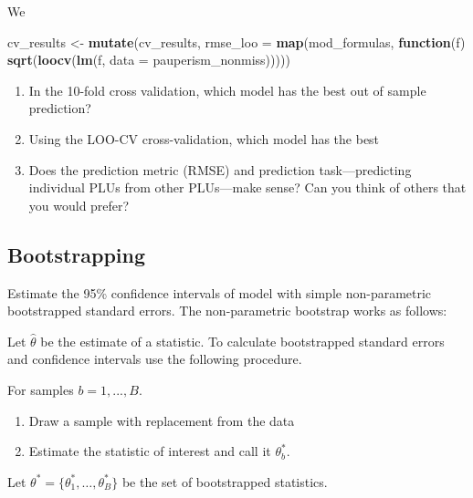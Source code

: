 \documentclass[]{article}
\newenvironment{Shaded}{\begin{snugshade}}{\end{snugshade}}
\newcommand{\KeywordTok}[1]{\textcolor[rgb]{0.13,0.29,0.53}{\textbf{#1}}}
\newcommand{\DataTypeTok}[1]{\textcolor[rgb]{0.13,0.29,0.53}{#1}}
\newcommand{\StringTok}[1]{\textcolor[rgb]{0.31,0.60,0.02}{#1}}
\newcommand{\ControlFlowTok}[1]{\textcolor[rgb]{0.13,0.29,0.53}{\textbf{#1}}}
\newcommand{\NormalTok}[1]{#1}
\providecommand{\tightlist}{%
  \setlength{\itemsep}{0pt}\setlength{\parskip}{0pt}}
\begin{document}
We

\begin{Shaded}
\begin{Highlighting}[]
\NormalTok{cv_results <-}\StringTok{ }
\StringTok{  }\KeywordTok{mutate}\NormalTok{(cv_results, }
         \DataTypeTok{rmse_loo =} \KeywordTok{map}\NormalTok{(mod_formulas, }\ControlFlowTok{function}\NormalTok{(f) }\KeywordTok{sqrt}\NormalTok{(}\KeywordTok{loocv}\NormalTok{(}\KeywordTok{lm}\NormalTok{(f, }\DataTypeTok{data =}\NormalTok{ pauperism_nonmiss)))))}
\end{Highlighting}
\end{Shaded}

\begin{enumerate}
\def\labelenumi{\arabic{enumi}.}
\tightlist
\item
  In the 10-fold cross validation, which model has the best out of
  sample prediction?
\item
  Using the LOO-CV cross-validation, which model has the best
\item
  Does the prediction metric (RMSE) and prediction task---predicting
  individual PLUs from other PLUs---make sense? Can you think of others
  that you would prefer?
\end{enumerate}

\subsection{Bootstrapping}\label{bootstrapping}

Estimate the 95\% confidence intervals of model with simple
non-parametric bootstrapped standard errors. The non-parametric
bootstrap works as follows:

Let \(\hat\theta\) be the estimate of a statistic. To calculate
bootstrapped standard errors and confidence intervals use the following
procedure.

For samples \(b = 1, ..., B\).

\begin{enumerate}
\def\labelenumi{\arabic{enumi}.}
\tightlist
\item
  Draw a sample with replacement from the data
\item
  Estimate the statistic of interest and call it \(\theta_b^*\).
\end{enumerate}

Let \(\theta^* = \{\theta_1^*, \dots, \theta_B^*\}\) be the set of
bootstrapped statistics.
\end{document}
